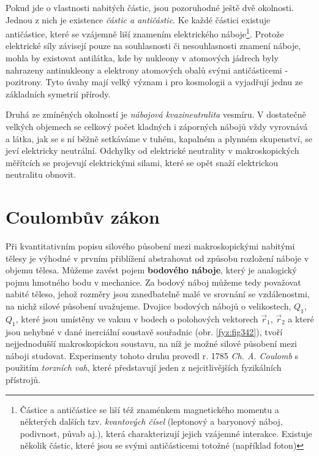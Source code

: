     Pokud jde o vlastnosti nabitých částic, jsou pozoruhodné ještě dvě okolnosti. Jednou z nich je
    existence \emph{částic a antičástic}. Ke každé částici existuje antičástice, které se vzájemně
    liší znamením elektrického náboje\footnote{Částice a antičástice se liší též znaménkem
    magnetického momentu a některých dalších tzv. \emph{kvantových čísel} (leptonový a  baryonový
    náboj, podivnost, půvab aj.), která charakterizují jejich vzájemné interakce. Existuje několik
    částic, které jsou se svými antičásticemi totožné (například foton)}. Protože elektrické síly
    závisejí pouze na souhlasnosti či nesouhlasnosti znamení náboje, mohla by existovat antilátka,
    kde by nukleony v atomových jádrech byly nahrazeny antinukleony a elektrony atomových obalů
    svými antičásticemi - pozitrony. Tyto úvahy mají velký význam i pro kosmologii a vyjadřují jednu
    ze základních symetrií přírody.
    
    Druhá ze zmíněných okolností je \emph{nábojová kvazineutralita} vesmíru. V dostatečně velkých
    objemech se celkový počet kladných i záporných nábojů vždy vyrovnává a látka, jak se s ní běžně
    setkáváme v tuhém, kapalném a plynném skupenství, se jeví elektricky neutrální. Odchylky od
    elektrické neutrality v makroskopických měřítcích se projevují elektrickými silami, které se
    opět snaží elektrickou neutralitu obnovit.
    
  \section{Coulombův zákon}\label{fyz:IIIchapIsecII}
    Při kvantitativním popisu silového působení mezi makroskopickými nabitými tělesy je výhodné v
    prvním přiblížení abstrahovat od způsobu rozložení náboje v objemu tělesa. Můžeme zavést pojem
    \textbf{bodového náboje}, který je analogický pojmu hmotného bodu v mechanice. Za bodový náboj
    můžeme tedy považovat nabité těleso, jehož rozměry jsou zanedbatelně malé ve srovnání se
    vzdálenostmi, na nichž silové působení uvažujeme. Dvojice bodových nábojů o velikostech,
    \(Q_1\), \(Q_1\), které jsou umístěny ve vakuu v bodech o polohových vektorech \(\vec{r}_1\),
    \(\vec{r}_2\) a které jsou nehybné v dané inerciální soustavě souřadnic (obr. \ref{fyz:fig342}),
    tvoří nejjednodušší makroskopickou soustavu, na níž je možné silové působení mezi náboji
    studovat. Experimenty tohoto druhu provedl r. 1785 \emph{Ch. A. Coulomb} s použitím
    \emph{torzních vah}, které představují jeden z nejcitlivějších fyzikálních přístrojů. 

